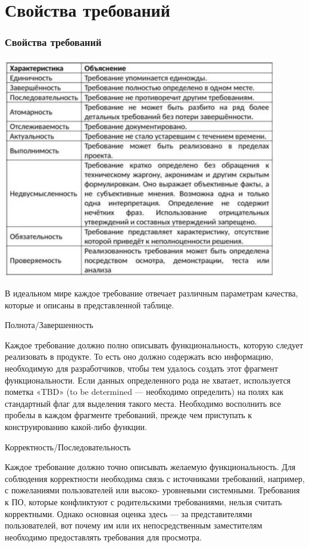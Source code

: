 \documentclass{../industrial-development}
\begin{document}
\section{Свойства требований}
\begin{frame} \frametitle{Свойства требований}
  \centerline{\includegraphics[width=0.9\textwidth]{pict2.pdf}}
\end{frame}

\lecturenotes

В идеальном мире каждое требование отвечает различным параметрам качества, которые и описаны в представленной таблице.

\alert{Полнота/Завершенность}

Каждое требование должно полно описывать функциональность, которую следует реализовать в продукте. То есть оно должно содержать
всю информацию, необходимую для разработчиков, чтобы тем удалось создать этот фрагмент функциональности. Если данных определенного рода не хватает, используется пометка «TBD» (to be determined — необходимо определить) на полях как стандартный флаг для выделения такого места. Необходимо восполнить все пробелы в каждом фрагменте требований, прежде чем приступать к конструированию какой-либо функции.

\alert{Корректность/Последовательность}

Каждое требование должно точно описывать желаемую функциональность. Для соблюдения корректности необходима связь с источниками требований, например, с пожеланиями пользователей или высоко-
уровневыми системными. Требования к ПО, которые конфликтуют с родительскими требованиями, нельзя считать корректными. Однако основная оценка здесь — за представителями пользователей, вот почему им или их непосредственным заместителям необходимо предоставлять требования для просмотра.
\end{document}
